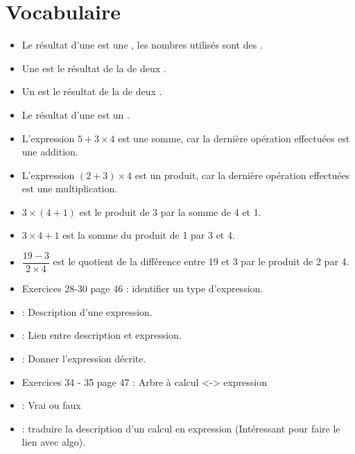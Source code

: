 \documentclass[12pt,a4paper]{article}
\begin{document}
\section{Vocabulaire}

\begin{mydefs}
	\begin{itemize}
		\item Le résultat d'une  est une , les nombres utilisés sont des .
		
		\item Une  est le résultat de la  de deux .
		
		\item Un  est le résultat de la  de deux .
		
		\item Le résultat d'une  est un .
	\end{itemize}
	
\end{mydefs}
	
\begin{myexs}
	\begin{itemize}
		\item L'expression $5 + 3 \times 4$ est une somme, car la dernière opération effectuées est une addition.
		
		\item L'expression $(2 + 3 ) \times 4$ est un produit, car la dernière opération effectuées est une multiplication.
		
		\item $ 3 \times (4 + 1)$ est le produit de 3 par la somme de 4 et 1.
		
		\item $ 3 \times 4 + 1$ est la somme du produit de 1 par 3 et  4.
		
		\item $\dfrac{19 - 3}{2 \times 4}$ est le quotient de la différence entre  19 et 3 par le produit de 2 par 4.
	\end{itemize}
\end{myexs}

\begin{myexos}
	\begin{itemize}
		\item Exercices 28-30 page 46 : identifier un type d'expression.
		\item {} : Description d'une expression.
		\item {} : Lien entre description et expression.
		\item {} : Donner l'expression décrite.
		\item Exercices 34 - 35 page 47 : Arbre à calcul <-> expression
		\item {} : Vrai ou faux
		\item {} : traduire la description d'un calcul en expression (Intéressant pour faire le lien avec algo).
	\end{itemize}
\end{myexos}
\end{document}
